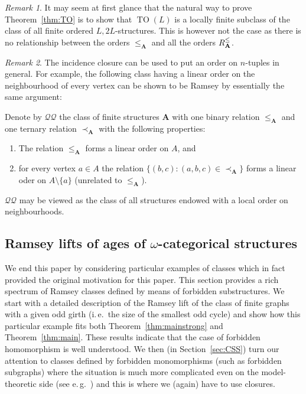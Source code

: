\documentclass{elsarticle}
\newcommand{\ie}{i.\,e.}
\newcommand{\eg}{e.\,g.}
\def\TO{\mathop{\mathrm{TO}}\nolimits}
\def\str#1{\mathbf {#1}}
\def\nbrel#1#2{R\ifstrempty{#1}{}{_{#1}}\ifstrempty{#2}{}{^{#2}}}
\def\rel#1#2{\nbrel{\ifstrempty{#1}{}{\str{#1}}}{#2}}
\theoremstyle{plain}
\theoremstyle{definition}
\theoremstyle{remark}
\newtheorem*{remark}{Remark}
\begin{document}
\begin{remark}
It may seem at first glance that the natural way to prove Theorem~\ref{thm:TO} is to
show that $\TO(L)$ is a locally finite subclass of the class of all finite ordered $L,2L$-structures. This is however not the case
as there is no relationship between the orders $\leq_\str{A}$ and all the orders $\rel{A}{\leq}$.
\end{remark}
\begin{remark}
The incidence closure can be used to put an order on $n$-tuples in general. For example, the following class having a linear order on the neighbourhood of every vertex can be shown to be Ramsey by essentially the same argument:

Denote by $\mathcal Q\mathcal Q$ the class of finite structures $\str{A}$
with one binary relation $\leq_\str{A}$ and one ternary relation $\prec_\str{A}$ with the following properties:
\begin{enumerate}
 \item The relation $\leq_\str{A}$ forms a linear order on $A$, and
 \item for every vertex $a\in A$ the relation $\{(b,c):(a,b,c)\in \prec_\str{A}\}$ forms a linear oder on $A\setminus \{a\}$ (unrelated to $\leq_\str{A}$).
\end{enumerate}
$\mathcal{QQ}$ may be viewed as the class of all structures endowed with a local order on neighbourhoods.
\end{remark}



\subsection {Ramsey lifts of ages of $\omega$-categorical structures}
\label{sec:exampleslifts}
We end this paper by considering particular examples of classes which in fact provided the original motivation for this paper.
This section provides a rich spectrum of Ramsey classes defined by means of forbidden substructures.
We start with a detailed description of the Ramsey lift of the class of finite graphs with a given odd girth (\ie{}\ the size of the smallest odd cycle) and show how this particular
example fits both Theorem~\ref{thm:mainstrong} and Theorem~\ref{thm:main}. These results indicate that the case of forbidden homomorphism is well understood.
We then (in Section~\ref{sec:CSS}) turn our attention to classes defined by forbidden monomorphisms (such as forbidden subgraphs) where the situation is much more complicated even on the model-theoretic side (see \eg{}\ \cite{Cherlin2011}) and this is where we (again) have to use closures.
\end{document}
